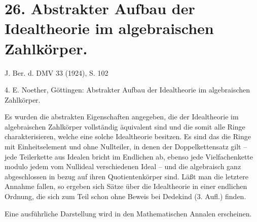 \documentclass[11pt]{article}
\begin{document}
\section*{26. Abstrakter Aufbau der Idealtheorie im algebraischen Zahlkörper.}

\begin{center}
J. Ber. d. DMV 33 (1924), S. 102
\end{center}

4. E. Noether, Göttingen: Abstrakter Aufbau der Idealtheorie im algebraischen Zahlkörper.

Es wurden die abstrakten Eigenschaften angegeben, die der Idealtheorie im algebraischen Zahlkörper vollständig äquivalent sind und die somit alle Ringe charakterisieren, welche eine solche Idealtheorie besitzen. Es sind das die Ringe mit Einheitselement und ohne Nullteiler, in denen der Doppelkettensatz gilt -- jede Teilerkette aus Idealen bricht im Endlichen ab, ebenso jede Vielfachenkette modulo jedem vom Nullideal verschiedenen Ideal -- und die algebraisch ganz abgeschlossen in bezug auf ihren Quotientenkörper sind. Läßt man die letztere Annahme fallen, so ergeben sich Sätze über die Idealtheorie in einer endlichen Ordnung, die sich zum Teil schon ohne Beweis bei Dedekind (3. Aufl.) finden.

Eine ausführliche Darstellung wird in den Mathematischen Annalen erscheinen.
\end{document}
